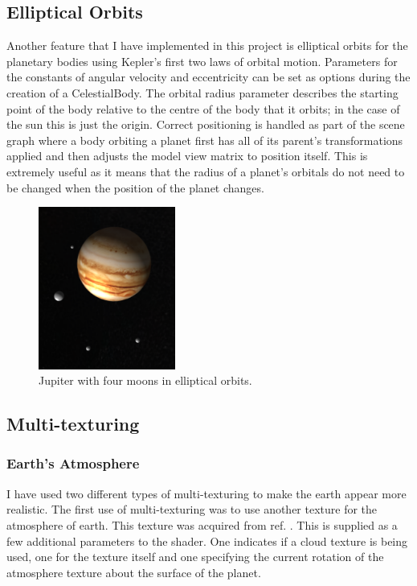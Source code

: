 \documentclass[conference]{IEEEtran}
\begin{document}
\subsection{Elliptical Orbits}
Another feature that I have implemented in this project is elliptical orbits for the planetary bodies using Kepler's first two laws of orbital motion. Parameters for the constants of angular velocity and eccentricity can be set as options during the creation of a CelestialBody. The orbital radius parameter describes the starting point of the body relative to the centre of the body that it orbits; in the case of the sun this is just the origin. Correct positioning is handled as part of the scene graph where a body orbiting a planet first has all of its parent's transformations applied and then adjusts the model view matrix to position itself. This is extremely useful as it means that the radius of a planet's orbitals do not need to be changed when the position of the planet changes.

\begin{figure}[!t]
\centering
\includegraphics[width=0.4\textwidth]{img/jupiter_moons.png}
\caption{Jupiter with four moons in elliptical orbits.}
\label{fig:jupiter-moons-elliptical}
\end{figure}

\subsection{Multi-texturing}

\subsubsection{Earth's Atmosphere}
I have used two different types of multi-texturing to make the earth appear more realistic. The first use of multi-texturing was to use another texture for the atmosphere of earth. This texture was acquired from ref. \cite{skytexture}. This is supplied as a few additional parameters to the shader. One indicates if a cloud texture is being used, one for the texture itself and one specifying the current rotation of the atmosphere texture about the surface of the planet.
\end{document}
